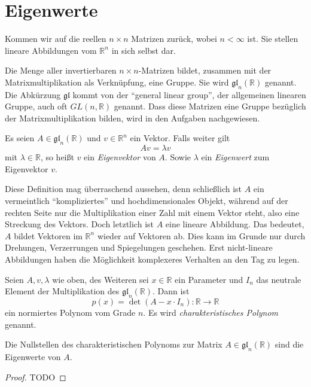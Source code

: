 


\chapter{Eigenwerte}

Kommen wir auf die reellen $n\times n$ Matrizen zurück, wobei $n<\infty$ ist. Sie stellen lineare Abbildungen vom $\mathbb{R}^n$ in sich selbst dar. 
\begin{definition}
Die Menge aller invertierbaren $n\times n$-Matrizen bildet, zusammen mit der Matrixmultiplikation als Verknüpfung, eine Gruppe. Sie wird $\mathfrak{gl}_n(\mathbb{R})$ genannt. Die Abkürzung $\mathfrak{gl}$ kommt von der "`general linear group"', der allgemeinen linearen Gruppe, auch oft $GL(n,\mathbb{R})$ genannt. Dass diese Matrizen eine Gruppe bezüglich der Matrixmultiplikation bilden, wird in den Aufgaben nachgewiesen.
\end{definition}


\begin{definition}
Es seien $A\in \mathfrak{gl}_n(\mathbb{R})$ und $v\in \mathbb{R}^n$ ein Vektor. Falls weiter gilt
\[
Av = \lambda v
\]
mit $\lambda\in \mathbb{R}$, so heißt $v$ ein \textsl{Eigenvektor} von $A$. Sowie $\lambda$ ein \textsl{Eigenwert} zum Eigenvektor $v$.
\end{definition}

Diese Definition mag überraschend aussehen, denn schließlich ist $A$ ein vermeintlich "`kompliziertes"' und hochdimensionales Objekt, während auf der rechten Seite nur die Multiplikation einer Zahl mit einem Vektor steht, also eine Streckung des Vektors. Doch letztlich ist $A$ eine lineare Abbildung. Das bedeutet, $A$ bildet Vektoren im $\mathbb{R}^n$ wieder auf Vektoren ab. Dies kann im Grunde nur durch Drehungen, Verzerrungen und Spiegelungen geschehen. Erst nicht-lineare Abbildungen haben die Möglichkeit komplexeres Verhalten an den Tag zu legen. 

\begin{definition}
Seien $A,v,\lambda$ wie oben, des Weiteren sei $x\in \mathbb{R}$ ein Parameter und $I_n$ das neutrale Element der Multiplikation des $\mathfrak{gl}_n(\mathbb{R})$. Dann ist 
\[
p(x) = \det(A-x\cdot I_n) : \mathbb{R} \longrightarrow \mathbb{R}
\]
ein normiertes Polynom vom Grade $n$. Es wird \textsl{charakteristisches Polynom} genannt.
\end{definition}

\begin{theorem}
Die Nullstellen des charakteristischen Polynoms zur Matrix $A\in \mathfrak{gl}_n(\mathbb{R})$ sind die Eigenwerte von $A$.
\end{theorem}
\begin{proof}
TODO
\end{proof}

